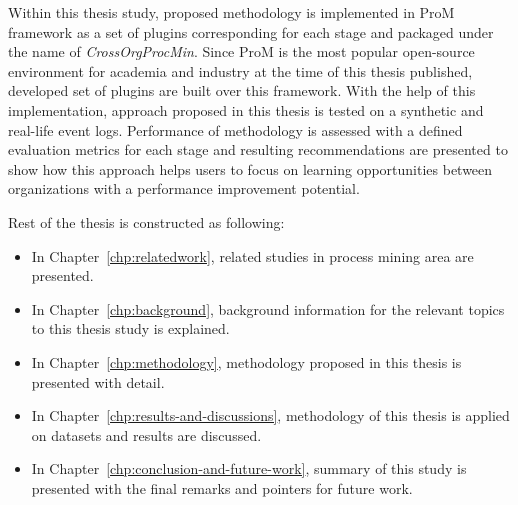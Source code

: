 Within this thesis study, proposed methodology is implemented in ProM framework \cite{verbeek2010prom} as a set of plugins corresponding for each stage and packaged under the name of \textit{CrossOrgProcMin}. Since ProM is the most popular open-source environment for academia and industry at the time of this thesis published, developed set of plugins are built over this framework. With the help of this implementation, approach proposed in this thesis is tested on a synthetic and real-life event logs. Performance of methodology is assessed with a defined evaluation metrics for each stage and resulting recommendations are presented to show how this approach helps users to focus on learning opportunities between organizations with a performance improvement potential.

Rest of the thesis is constructed as following:
\begin{itemize}
	\item In Chapter~\ref{chp:relatedwork}, related studies in process mining area are presented. 
	\item In Chapter~\ref{chp:background}, background information for the relevant topics to this thesis study is explained.
	\item In Chapter~\ref{chp:methodology}, methodology proposed in this thesis is presented with detail.
	\item In Chapter~\ref{chp:results-and-discussions}, methodology of this thesis is applied on datasets and results are discussed.
	\item In Chapter~\ref{chp:conclusion-and-future-work}, summary of this study is presented with the final remarks and pointers for future work. 
\end{itemize}

